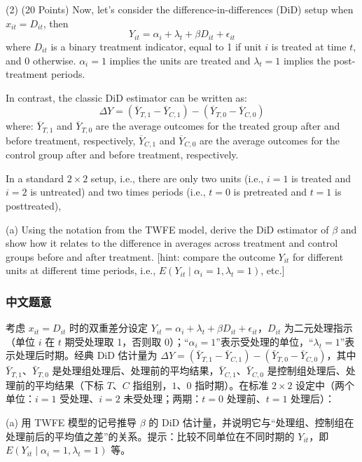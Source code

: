 \begin{tcolorbox}[bxbase,colback=gray!4,colframe=gray!55!black,boxed title style={colback=gray!55!black},fontupper=\small,title={Question (2), stem and part (a)}]
(2) (20 Points) Now, let's consider the difference-in-differences (DiD) setup when $x_{it}=D_{it}$, then
\[
Y_{it}=\alpha_i+\lambda_t+\beta D_{it}+\epsilon_{it}
\]
where $D_{it}$ is a binary treatment indicator, equal to 1 if unit $i$ is treated at time $t$, and 0 otherwise. $\alpha_i=1$ implies the units are treated and $\lambda_t=1$ implies the post-treatment periods.

In contrast, the classic DiD estimator can be written as:
\[
\Delta Y=(\overline Y_{T,1}-\overline Y_{C,1})-(\overline Y_{T,0}-\overline Y_{C,0})
\]
where: $\overline Y_{T,1}$ and $\overline Y_{T,0}$ are the average outcomes for the treated group after and before treatment, respectively, $\overline Y_{C,1}$ and $\overline Y_{C,0}$ are the average outcomes for the control group after and before treatment, respectively.

In a standard $2\times2$ setup, i.e., there are only two units (i.e., $i=1$ is treated and $i=2$ is untreated) and two times periods (i.e., $t=0$ is pretreated and $t=1$ is posttreated),

(a) Using the notation from the TWFE model, derive the DiD estimator of $\beta$ and show how it relates to the difference in averages across treatment and control groups before and after treatment. [hint: compare the outcome $Y_{it}$ for different units at different time periods, i.e., $E(Y_{it}\mid\alpha_i=1,\lambda_t=1)$, etc.]
\end{tcolorbox}

\subsubsection{中文题意}

考虑 $x_{it}=D_{it}$ 时的双重差分设定 $Y_{it}=\alpha_i+\lambda_t+\beta D_{it}+\epsilon_{it}$，$D_{it}$ 为二元处理指示（单位 $i$ 在 $t$ 期受处理取 1，否则取 0）；“$\alpha_i=1$”表示受处理的单位，“$\lambda_t=1$”表示处理后时期。经典 DiD 估计量为 $\Delta Y=(\bar Y_{T,1}-\bar Y_{C,1})-(\bar Y_{T,0}-\bar Y_{C,0})$，其中 $\bar Y_{T,1}$、$\bar Y_{T,0}$ 是处理组处理后、处理前的平均结果，$\bar Y_{C,1}$、$\bar Y_{C,0}$ 是控制组处理后、处理前的平均结果（下标 $T$、$C$ 指组别，$1$、$0$ 指时期）。在标准 $2\times2$ 设定中（两个单位：$i=1$ 受处理、$i=2$ 未受处理；两期：$t=0$ 处理前、$t=1$ 处理后）：

(a) 用 TWFE 模型的记号推导 $\beta$ 的 DiD 估计量，并说明它与“处理组、控制组在处理前后的平均值之差”的关系。提示：比较不同单位在不同时期的 $Y_{it}$，即 $E(Y_{it}\mid\alpha_i=1,\lambda_t=1)$ 等。


